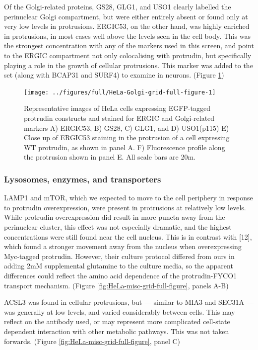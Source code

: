 \documentclass[
  12pt,
  a4paper,
]{book}
\begin{document}
Of the Golgi-related proteins, GS28, GLG1, and USO1 clearly labelled the perinuclear Golgi compartment, but were either entirely absent or found only at very low levels in protrusions. ERGIC53, on the other hand, was highly enriched in protrusions, in most cases well above the levels seen in the cell body. This was the strongest concentration with any of the markers used in this screen, and point to the ERGIC compartment not only colocalising with protrudin, but specifically playing a role in the growth of cellular protrusions. This marker was added to the set (along with BCAP31 and SURF4) to examine in neurons. (Figure \ref{fig:HeLa-Golgi-grid-full-figure})

\begin{figure}
\texttt{[image: ../figures/full/HeLa-Golgi-grid-full-figure-1]} \caption[Protrudin-expressing HeLa cells stained for ERGIC53, GS28, GLG1, and USO1]{Representative images of HeLa cells expressing EGFP-tagged protrudin constructs and stained for ERGIC and Golgi-related markers A) ERGIC53, B) GS28, C) GLG1, and D) USO1(p115)  E) Close up of ERGIC53 staining in the protrusion of a cell expressing WT protrudin, as shown in panel A.  F) Fluorescence profile along the protrusion shown in panel E.  All scale bars are 20\textmu{}m.}\label{fig:HeLa-Golgi-grid-full-figure}
\end{figure}

\hypertarget{lysosomes-enzymes-and-transporters}{%
\subsubsection{Lysosomes, enzymes, and transporters}\label{lysosomes-enzymes-and-transporters}}

LAMP1 and mTOR, which we expected to move to the cell periphery in response to protrudin overexpression, were present in protrusions at relatively low levels. While protrudin overexpression did result in more puncta away from the perinuclear cluster, this effect was not especially dramatic, and the highest concentrations were still found near the cell nucleus. This is in contrast with {[}12{]}, which found a stronger movement away from the nucleus when overexpressing Myc-tagged protrudin. However, their culture protocol differed from ours in adding 2mM supplemental glutamine to the culture media, so the apparent differences could reflect the amino acid dependence of the protrudin-FYCO1 transport mechanism. (Figure \ref{fig:HeLa-misc-grid-full-figure}, panels A-B)

ACSL3 was found in cellular protrusions, but --- similar to MIA3 and SEC31A --- was generally at low levels, and varied considerably between cells. This may reflect on the antibody used, or may represent more complicated cell-state dependent interaction with other metabolic pathways. This was not taken forwards. (Figure \ref{fig:HeLa-misc-grid-full-figure}, panel C)
\end{document}
